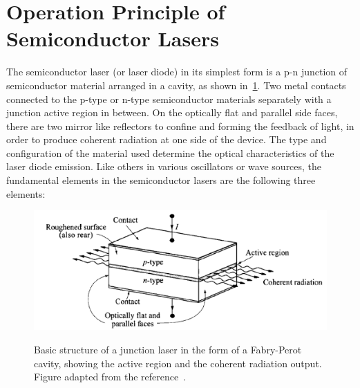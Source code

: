 \section{Operation Principle of Semiconductor Lasers} \label{SLoperation}

The semiconductor laser (or laser diode) in its simplest form is a p-n junction
of semiconductor material arranged in a cavity, as shown
in~\ref{LaserStructure}. Two metal contacts connected to the p-type or n-type
semiconductor materials separately with a junction active region in between. On
the optically flat and parallel side faces, there are two mirror like
reflectors to confine and forming the feedback of light, in order to produce
coherent radiation at one side of the device.  The type and configuration of
the material used determine the optical characteristics of the laser diode
emission. Like others in various oscillators or wave sources, the fundamental
elements in the semiconductor lasers are the following three elements:

\begin{figure}
  \caption[Basic structure of a junction laser in the form of a Fabry-Perot cavity, showing the active region and the coherent radiation output.]{Basic structure of a junction laser in the form of a Fabry-Perot cavity, showing the active region and the coherent radiation output. Figure adapted from the reference~\cite{sze2006physics}.}
  \centering
  \includegraphics[width=\textwidth]{pictures/LT/LaserStructure}
  \label{LaserStructure}
\end{figure}

